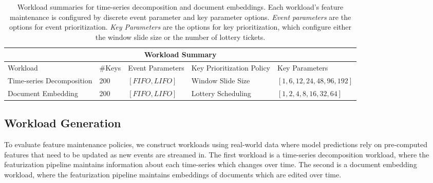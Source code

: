 

\begin{table}[t]
  \centering
\begin{tabular}{ |p{4cm}||p{1cm}|p{2.8cm}|p{3.5cm}|p{3.2cm}|  }
 \hline
 \multicolumn{5}{|c|}{Workload Summary} \\
 \hline
Workload & \#Keys & Event Parameters & Key Prioritization Policy & Key Parameters \\
 \hline
Time-series Decomposition &   200  & $[FIFO, LIFO]$ & Window Slide Size & $[1, 6, 12, 24, 48, 96, 192]$\\
Document Embedding   & 200    & $[FIFO, LIFO]$ &  Lottery Scheduling & $[1, 2, 4, 8, 16, 32, 64]$\\
 \hline
\end{tabular}
\caption{Workload summaries for time-series decomposition and document embeddings. Each workload's feature maintenance is configured by discrete event parameter and key parameter options. \textit{Event parameters} are the options for event prioritization. \textit{Key Parameters} are the options for key prioritization, which configure either the window slide size or the number of lottery tickets. }
\label{table:workloads}
\end{table}

\subsection{Workload Generation}
\label{ss:evaluation:workloads}
To evaluate feature maintenance policies, we construct workloads using real-world data where model predictions rely on pre-computed features that need to be updated as new events are streamed in. 
The first workload is a time-series decomposition workload, where the featurization pipeline maintains information about each time-series which changes over time. 
The second is a document embedding workload, where the featurization pipeline maintains embeddings of documents which are edited over time. %

